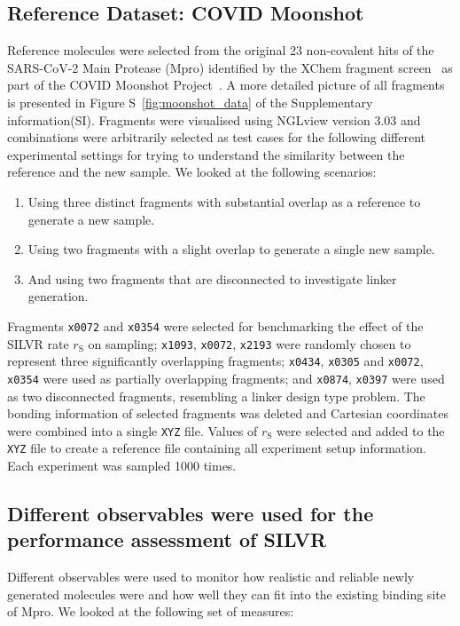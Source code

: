 \documentclass[journal=jacsat,manuscript=article]{achemso}
\begin{document}
\subsection{Reference Dataset: COVID Moonshot}
Reference molecules were selected from the original 23 non-covalent hits of the SARS-CoV-2 Main Protease (Mpro) identified by the XChem fragment screen~\cite{douangamath2020crystallographic} as part of the COVID Moonshot Project~\cite{consortium2023open, consortium2021open}. A more detailed picture of all fragments is presented in Figure S~\ref{fig:moonshot_data} of the Supplementary information(SI). Fragments were visualised using NGLview version 3.03 and combinations were arbitrarily selected as test cases for the following different experimental settings for trying to understand the similarity between the reference and the new sample. We looked at the following scenarios:
\begin{enumerate}
    \item Using three distinct fragments with substantial overlap as a reference to generate a new sample.
    \item Using two fragments with a slight overlap to generate a single new sample.
    \item And using two fragments that are disconnected to investigate linker generation.
\end{enumerate}
Fragments \texttt{x0072} and \texttt{x0354} were selected for benchmarking the effect of the SILVR rate $r_{\mathrm{S}}$ on sampling; \texttt{x1093}, \texttt{x0072}, \texttt{x2193} were randomly chosen to represent three significantly overlapping fragments; \texttt{x0434}, \texttt{x0305} and \texttt{x0072}, \texttt{x0354} were used as partially overlapping fragments; and \texttt{x0874}, \texttt{x0397} were used as two disconnected fragments, resembling a linker design type problem. The bonding information of selected fragments was deleted and Cartesian coordinates were combined into a single \texttt{XYZ} file. Values of $r_{\mathrm{S}}$ were selected and added to the \texttt{XYZ} file to create a reference file containing all experiment setup information. Each experiment was sampled 1000 times. 

\subsection{Different observables were used for the performance assessment of SILVR}

Different observables were used to monitor how realistic and reliable newly generated molecules were and how well they can fit into the existing binding site of Mpro. We looked at the following set of measures:
\end{document}
